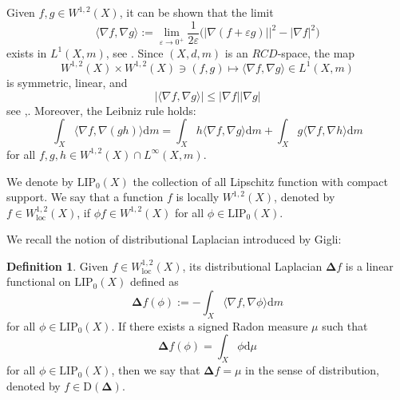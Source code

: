 \documentclass{article}
\theoremstyle{remark}
\numberwithin{equation}{section}
\theoremstyle{definition}
\newtheorem{definition}{Definition}[section]
\begin{document}
     Given $f,g \in W^{1,2}(X)$, it can be shown that the limit
     \begin{equation}
     	\langle \nabla f, \nabla g \rangle := \lim_{\varepsilon \to 0^{+}} \frac{1}{2\varepsilon} \big( \lvert \nabla (f + \varepsilon g) \rvert|^{2} - \lvert \nabla f \rvert^{2} \big)
     \end{equation}
     exists in $L^{1}(X,m)$, see \cite[Lemma 4.7]{Ambrosio-Gigli-Savare_2014}. Since $(X,d,m)$ is an $RCD$-space, the map
     \begin{equation}
     	W^{1,2}(X) \times W^{1,2}(X) \ni (f,g) \mapsto \langle \nabla f, \nabla g \rangle \in L^{1}(X,m)
     \end{equation}
     is symmetric, linear, and
     \begin{equation}
     	\left| \langle \nabla f, \nabla g \rangle \right| \le \left| \nabla f \right| \left| \nabla g \right|
     \end{equation}
     see \cite[Section 4.3]{Ambrosio-Gigli-Savare_2014},\cite[Section 4.3]{Gigli_2015}. Moreover, the Leibniz rule holds:
     \begin{equation}
     	\int_{X} \langle \nabla f, \nabla (gh) \rangle \mathrm{d}m = \int_{X} h \langle \nabla f, \nabla g \rangle \mathrm{d}m + \int_{X} g \langle \nabla f, \nabla h \rangle \mathrm{d}m
     \end{equation}
     for all $f,g,h \in W^{1,2}(X) \cap L^{\infty}(X,m)$.
     
     We denote by $\mathrm{LIP}_{0}(X)$ the collection of all Lipschitz function with compact support. We say that a function $f$ is locally $W^{1,2}(X)$, denoted by $f \in W^{1,2}_{\mathrm{loc}}(X)$, if $\phi f \in W^{1,2}(X)$ for all $\phi \in \mathrm{LIP}_{0}(X)$.
     
     We recall the notion of distributional Laplacian introduced by Gigli\cite{Gigli_2015}:
     \begin{definition}\label{Def_distributional_Laplacian}
     	Given $f \in W^{1,2}_{\mathrm{loc}}(X)$, its distributional Laplacian $\mathbf{\Delta} f$ is a linear functional on $\mathrm{LIP}_{0}(X)$ defined as
     	\begin{equation}
     		\mathbf{\Delta} f (\phi) := - \int_{X} \langle \nabla f, \nabla \phi \rangle \mathrm{d}m
     	\end{equation}
        for all $\phi \in \mathrm{LIP}_{0}(X)$. If there exists a signed Radon measure $\mu$ such that
        \begin{equation}
        	\mathbf{\Delta} f (\phi) = \int_{X} \phi \mathrm{d}\mu
        \end{equation}
        for all $\phi \in \mathrm{LIP}_{0}(X)$, then we say that $\mathbf{\Delta} f = \mu$ in the sense of distribution, denoted by $f \in \mathrm{D}(\mathbf{\Delta})$.
     \end{definition}
 
\end{document}
